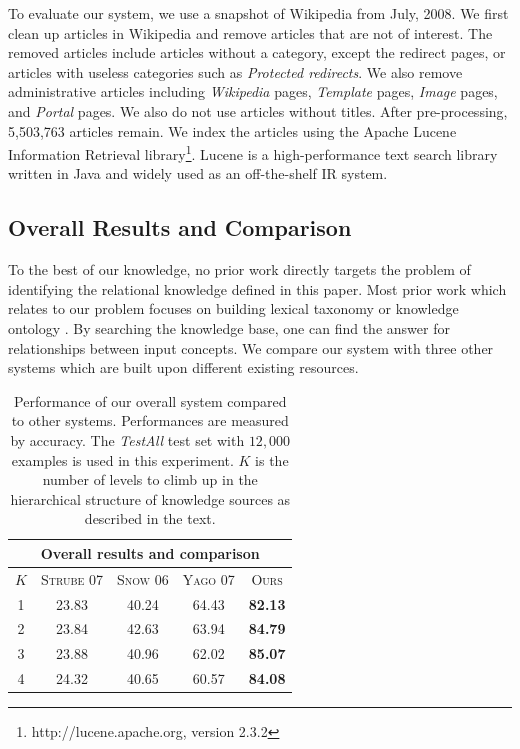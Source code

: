 To evaluate our system, we use a snapshot of Wikipedia from July,
2008. We first clean up articles in Wikipedia and remove articles that
are not of interest. The removed articles include articles without a
category, except the redirect pages, or articles with useless
categories such as {\em Protected redirects}. We also remove
administrative articles including {\em Wikipedia} pages, {\em
  Template} pages, {\em Image} pages, and {\em Portal} pages. We also
do not use articles without titles. After pre-processing, 5,503,763
articles remain. We index the articles using the Apache Lucene
Information Retrieval library\footnote{http://lucene.apache.org,
  version 2.3.2}. Lucene is a high-performance text search library
written in Java and widely used as an off-the-shelf IR system.

\subsection{Overall Results and Comparison}
\label{sec:exp-results}

To the best of our knowledge, no prior work directly targets the
problem of identifying the relational knowledge defined in this
paper. Most prior work which relates to our problem focuses on
building lexical taxonomy or knowledge ontology
\cite{Snow2006,wikitaxo07,suchanek2007WWW}. By searching the knowledge
base, one can find the answer for relationships between input
concepts. We compare our system with three other systems which are
built upon different existing resources.

\begin{table}[!t]
  \begin{center}
    \begin{tabular}{|c||c|c|c|c|}
      \hline
      \multicolumn{5}{|c|}{Overall results and comparison} \\
      \hline
      $K$  &  \textsc{Strube 07}  &  \textsc{Snow 06}  &  \textsc{Yago 07}  &  \textsc{Ours}            \\
      \hline
      1  &      23.83  &    40.24  &           64.43  &  \textbf{82.13}  \\
      2  &      23.84  &    42.63  &           63.94  &  \textbf{84.79}  \\
      3  &      23.88  &    40.96  &           62.02  &  \textbf{85.07}  \\
      4  &      24.32  &    40.65  &           60.57  &  \textbf{84.08}  \\
      \hline
    \end{tabular}
    \caption{Performance of our overall system compared to other
      systems. Performances are measured by accuracy. The {\em
        TestAll} test set with $12,000$ examples is used in this
      experiment. $K$ is the number of levels to climb up in the
      hierarchical structure of knowledge sources as described in the
      text.}
    \label{table:compare-others}
  \end{center}
\end{table}

